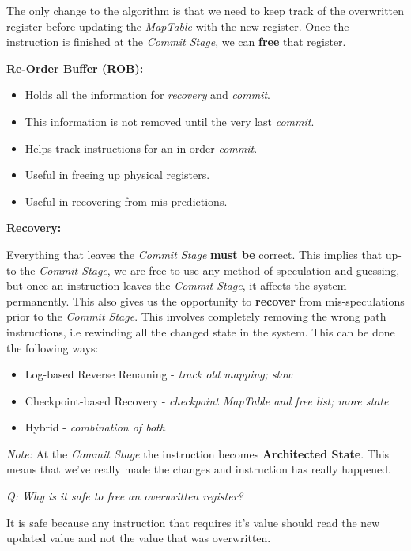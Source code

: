 \documentclass[12pt]{article}
\newenvironment{QandA}{\begin{enumerate}[label=\bfseries\arabic*.]\bfseries}
                      {\end{enumerate}}
\newenvironment{answered}{\par\quad\normalfont}{}
\begin{document}
\begin{QandA}
\begin{answered}
\quad The only change to the algorithm is that we need to keep track of the overwritten register before updating the \textit{MapTable} with the new register. Once the instruction is finished at the \textit{Commit Stage}, we can \textbf{free} that register. 

\textbf{Re-Order Buffer (ROB):}

\begin{itemize}
    \item Holds all the information for \textit{recovery} and \textit{commit}.
    \item This information is not removed until the very last \textit{commit}.
    \item Helps track instructions for an in-order \textit{commit}.
    \item Useful in freeing up physical registers.
    \item Useful in recovering from mis-predictions. 
\end{itemize}

\textbf{Recovery:}

Everything that leaves the \textit{Commit Stage} \textbf{must be} correct. This implies that up-to the \textit{Commit Stage}, we are free to use any method of speculation and guessing, but once an instruction leaves the \textit{Commit Stage}, it affects the system permanently. This also gives us the opportunity to \textbf{recover} from mis-speculations prior to the \textit{Commit Stage}. This involves completely removing the wrong path instructions, i.e rewinding all the changed state in the system. This can be done the following ways:
\begin{itemize}
    \item Log-based Reverse Renaming - \textit{track old mapping; slow}
    \item Checkpoint-based Recovery - \textit{checkpoint MapTable and free list; more state}
    \item Hybrid - \textit{combination of both}
\end{itemize}

\textit{Note:} At the \textit{Commit Stage} the instruction becomes \textbf{Architected State}. This means that we've really made the changes and instruction has really happened. 

\textit{Q: Why is it safe to free an overwritten register?}

\quad It is safe because any instruction that requires it's value should read the new updated value and not the value that was overwritten. 
\end{answered}


\end{QandA}
\end{document}
